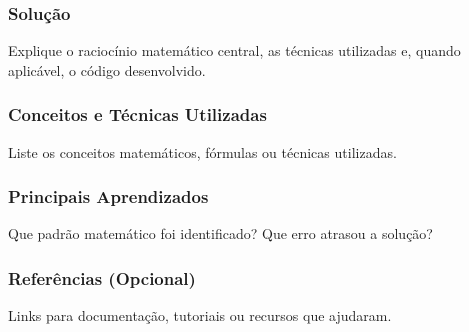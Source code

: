 \subsubsection*{Solução}
Explique o raciocínio matemático central, as técnicas utilizadas e, quando aplicável, o
código desenvolvido.
\vspace{3.5em}

\subsubsection*{Conceitos e Técnicas Utilizadas}
Liste os conceitos matemáticos, fórmulas ou técnicas utilizadas.
\vspace{3em}

\subsubsection*{Principais Aprendizados}
Que padrão matemático foi identificado? Que erro atrasou a solução?
\vspace{3em}

\subsubsection*{Referências (Opcional)}
Links para documentação, tutoriais ou recursos que ajudaram.
